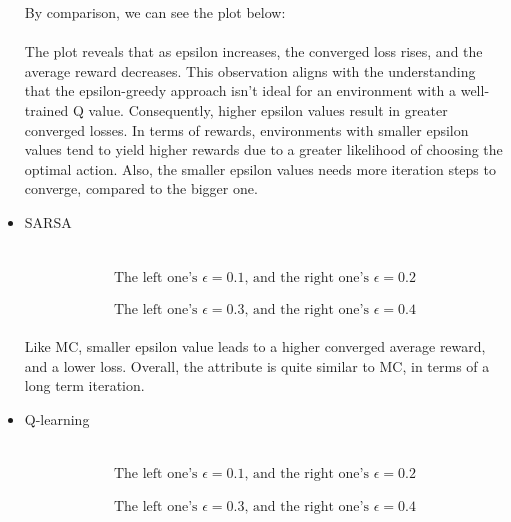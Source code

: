 \documentclass[a4paper]{article}
\begin{document}
\begin{answer}
\begin{itemize}
				By comparison, we can see the plot below:\\ 
				\\
				The plot reveals that as epsilon increases, the converged loss rises, and the average reward decreases. This observation aligns with the understanding that the epsilon-greedy approach isn't ideal for an environment with a well-trained Q value. Consequently, higher epsilon values result in greater converged losses. In terms of rewards, environments with smaller epsilon values tend to yield higher rewards due to a greater likelihood of choosing the optimal action. Also, the smaller epsilon values needs more iteration steps to converge, compared to the bigger one.
			\item SARSA\\
				\\
				\\
				\[\text{The left one's $\epsilon = 0.1$, and the right one's $\epsilon = 0.2$} \]
				\\
				\[\text{The left one's $\epsilon = 0.3$, and the right one's $\epsilon = 0.4$} \]
				\\
				Like MC, smaller epsilon value leads to a higher converged average reward, and a lower loss. Overall, the attribute is quite similar to MC, in terms of a long term iteration.
			\item Q-learning\\
				\\
				\\
				\[\text{The left one's $\epsilon = 0.1$, and the right one's $\epsilon = 0.2$} \]
				\\
				\[\text{The left one's $\epsilon = 0.3$, and the right one's $\epsilon = 0.4$} \]

\end{itemize}
\end{answer}
\end{document}
